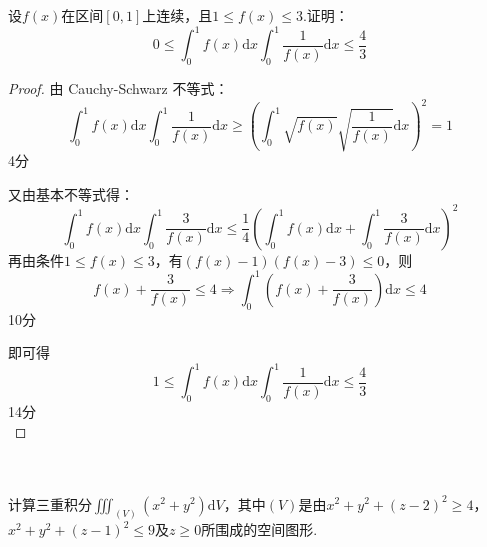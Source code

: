 \documentclass[hideanswer=false,
	enfont=newtxtext,
	zhfont=empty,
	mathfont=newtxmath,
]{cmcthesis}
\begin{document}
\\\\
设$f(x)$在区间$[0,1]$上连续，且$1\leq f\left(x\right)\leq3$.证明：
	\[
	0\leq\int_0^1{f\left(x\right)\mathrm{d}x\int_0^1{\frac{1}{f\left(x\right)}\mathrm{d}x\leq\frac{4}{3}}}
	\]
	\begin{answer}
	\begin{proof}
	由 Cauchy-Schwarz 不等式：
	\[
	\int_0^1{f\left(x\right)\mathrm{d}x\int_0^1{\frac{1}{f\left(x\right)}\mathrm{d}x\geq\left(\int_0^1{\sqrt{f\left(x\right)}\sqrt{\frac{1}{f\left(x\right)}}}\mathrm{d}x\right)}^2}=1
	\]
\hfill\dotfill 4分

又由基本不等式得：
	\[
	\int_0^1{f\left(x\right)\mathrm{d}x\int_0^1{\frac{3}{f\left(x\right)}}\mathrm{d}x}\leq\frac{1}{4}\left(\int_0^1{f\left(x\right)\mathrm{d}x+\int_0^1{\frac{3}{f\left(x\right)}\mathrm{d}x}}\right)^2
	\]
再由条件$1\leq f\left(x\right)\leq 3$，有$\left(f\left(x\right)-1\right)\left(f\left(x\right)-3\right)\leq 0$，则
	\[
	f\left(x\right)+\frac{3}{f\left(x\right)}\leq 4\Rightarrow\int_0^1{\left(f\left(x\right)+\frac{3}{f\left(x\right)}\right)\mathrm{d}x\leq 4}
	\]
\hfill\dotfill 10分

即可得
	\[
	1\le\int_0^1{f\left(x\right)\mathrm{d}x\int_0^1{\frac{1}{f\left(x\right)}\mathrm{d}x\le\frac{4}{3}}}
	\]
\hfill\dotfill 14分\\
	\end{proof}
	\end{answer}
\\\\
计算三重积分$ \iiint_{\left(V\right)}{\left(x^2+y^2\right)}\mathrm{d}V
$，其中$(V)$是由$x^2+y^2+\left(z-2\right)^2\geq 4$，$x^2+y^2+\left(z-1\right)^2\leq9$及$z\geq0$所围成的空间图形.
\end{document}
